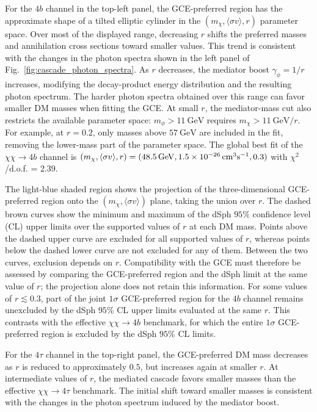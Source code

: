 \documentclass[superscriptaddress,
showpacs,preprintnumbers,nofootinbib,eqsecnum,amsmath,amssymb,aps,11pt, groupedaddress, floatfix]{revtex4-2}
\begin{document}
For the $4b$ channel in the top-left panel, the GCE-preferred
region has the approximate shape of a tilted elliptic cylinder
in the $(m_\chi,\langle\sigma v\rangle,r)$ parameter space.
Over most of the displayed range, decreasing $r$ shifts the
preferred masses and annihilation cross sections toward smaller
values.
This trend is consistent with the changes in the photon spectra
shown in the left panel of Fig.~\ref{fig:cascade_photon_spectra}.
As $r$ decreases, the mediator boost $\gamma_\phi=1/r$ increases, modifying the decay-product energy
distribution and the resulting photon spectrum.
The harder photon spectra obtained over this range can favor
smaller DM masses when fitting the GCE.
At small $r$, the mediator-mass cut also restricts the available
parameter space: $m_\phi>11~\mathrm{GeV}$ requires
$m_\chi>11~\mathrm{GeV}/r$.
For example, at $r=0.2$, only masses above $57~\mathrm{GeV}$
are included in the fit, removing the lower-mass part of the
parameter space.
The global best fit of the $\chi \chi \to 4b$ channel is $(m_\chi, \langle \sigma v \rangle, r) = (48.5\,{\rm GeV}, 1.5 \times 10^{-26}\,{\rm cm}^3{\rm s}^{-1},0.3)$ with $\chi^2$/d.o.f. = 2.39.

The light-blue shaded region shows the projection of the
three-dimensional GCE-preferred region onto the $(m_\chi,\langle \sigma v\rangle)$ plane, taking the union over $r$.
The dashed brown curves show the minimum
and maximum of the dSph $95\%$ confidence level (CL) upper limits over
the supported values of $r$ at each DM mass.
Points above the dashed upper curve are excluded for all supported
values of $r$, whereas points below the dashed lower curve are not
excluded for any of them.
Between the two curves, exclusion depends on $r$.
Compatibility with the GCE must therefore be assessed by comparing
the GCE-preferred region and the dSph limit at the same value of
$r$; the projection alone does not retain this information.
For some values of $r \lesssim 0.3$, part of the joint $1\sigma$
GCE-preferred region for the $4b$ channel remains unexcluded by the dSph $95\%$ CL upper limits evaluated
at the same $r$.
This contrasts with the effective $\chi\chi\to4b$ benchmark,
for which the entire $1\sigma$ GCE-preferred region is excluded
by the dSph $95\%$ CL limits.

For the $4\tau$ channel in the top-right panel, the GCE-preferred DM mass decreases as $r$ is reduced to approximately $0.5$, but increases again at smaller $r$.
At intermediate values of $r$, the mediated cascade favors smaller masses than the effective $\chi\chi \to 4\tau$ benchmark.
The initial shift toward smaller masses is consistent with
the changes in the photon spectrum induced by the mediator boost.
\end{document}
